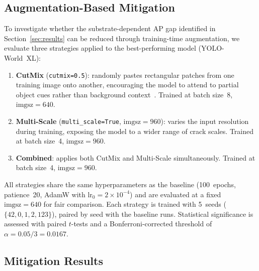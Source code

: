 

\subsection{Augmentation-Based Mitigation}
\label{sec:mitigation}

To investigate whether the substrate-dependent AP gap identified in
Section~\ref{sec:results} can be reduced through training-time
augmentation, we evaluate three strategies applied to the best-performing
model (YOLO-World~XL):

\begin{enumerate}
    \item \textbf{CutMix} (\texttt{cutmix=0.5}): randomly pastes
          rectangular patches from one training image onto another,
          encouraging the model to attend to partial object cues rather
          than background context~\cite{yun2019cutmix}.
          Trained at batch size~8, $\text{imgsz}=640$.
    \item \textbf{Multi-Scale} (\texttt{multi\_scale=True},
          $\text{imgsz}=960$): varies the input resolution during
          training, exposing the model to a wider range of crack
          scales.  Trained at batch size~4, $\text{imgsz}=960$.
    \item \textbf{Combined}: applies both CutMix and Multi-Scale
          simultaneously.  Trained at batch size~4, $\text{imgsz}=960$.
\end{enumerate}

\noindent
All strategies share the same hyperparameters as the baseline
(100~epochs, patience~20, AdamW with $\text{lr}_0=2\!\times\!10^{-4}$)
and are evaluated at a fixed $\text{imgsz}=640$ for fair comparison.
Each strategy is trained with 5~seeds
($\{42,0,1,2,123\}$), paired by seed with the baseline runs.
Statistical significance is assessed with paired $t$-tests and a
Bonferroni-corrected threshold of $\alpha=0.05/3=0.0167$.


\subsection{Mitigation Results}
\label{sec:mitigation_results}


